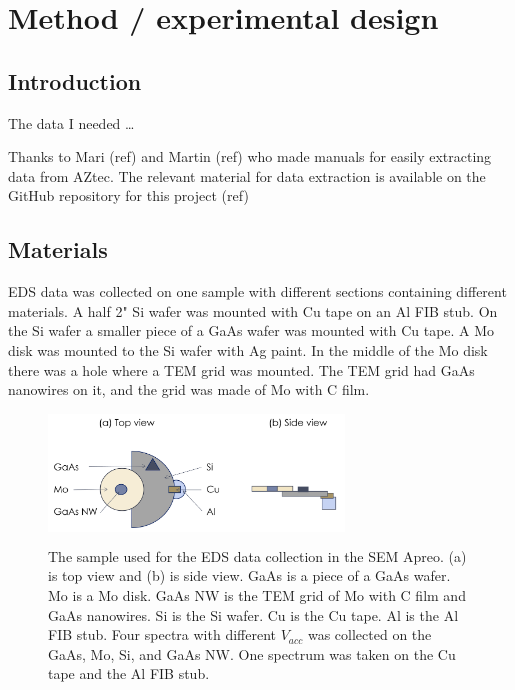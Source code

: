 \chapter{Method / experimental design}
\label{chap:method}



%
%
\section{Introduction}
\label{sec:method:intro}
The data I needed \dots


Thanks to Mari (ref) and Martin (ref) who made manuals for easily extracting data from AZtec.
The relevant material for data extraction is available on the GitHub repository for this project (ref)


%
%
\section{Materials}
\label{sec:method:materials}
EDS data was collected on one sample with different sections containing different materials.
A half 2" Si wafer was mounted with Cu tape on an Al FIB stub.
On the Si wafer a smaller piece of a GaAs wafer was mounted with Cu tape.
A Mo disk was mounted to the Si wafer with Ag paint.
In the middle of the Mo disk there was a hole where a TEM grid was mounted.
The TEM grid had GaAs nanowires on it, and the grid was made of Mo with C film.

\begin{figure}[ht]
    \centering
    \colorbox{white}{\includegraphics[width=0.7\textwidth]{figures/Materials-sample1.png}}
    \caption{
        The sample used for the EDS data collection in the SEM Apreo.
        (a) is top view and (b) is side view.
        GaAs is a piece of a GaAs wafer.
        Mo is a Mo disk.
        GaAs NW is the TEM grid of Mo with C film and GaAs nanowires.
        Si is the Si wafer.
        Cu is the Cu tape.
        Al is the Al FIB stub.
        Four spectra with different $V_{acc}$ was collected on the GaAs, Mo, Si, and GaAs NW.
        One spectrum was taken on the Cu tape and the Al FIB stub.
    }
    \label{fig:method:materials:sample1}
\end{figure}



